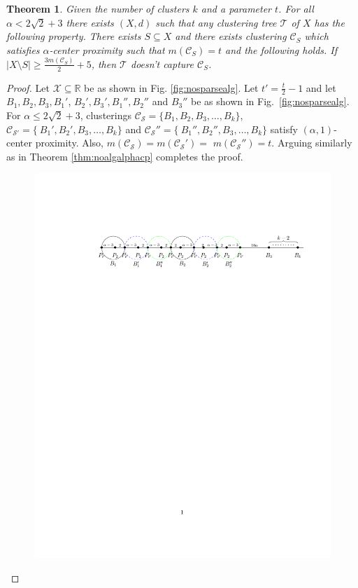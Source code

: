 \documentclass[12pt]{article}
\newtheorem{theorem}{Theorem}
\newcommand{\mc}{\mathcal}
\begin{document}
\begin{theorem}
\label{thm:nosparsealg}
Given the number of clusters $k$ and a parameter $t$. For all $\alpha < 2\sqrt 2 + 3$ there exists $(X, d)$ such that any clustering tree $\mc T$ of $X$ has the following property. There exists $S \subseteq X$ and there exists clustering $\mc C_{S}$ which satisfies $\alpha$-center proximity such that $m(\mc C_{S}) = t$ and the following holds. If $|X \setminus S| \ge \frac{3m(\mc C_{S})}{2}+5$, then $\mc T$ doesn't capture $\mc C_{S}$.
\end{theorem}
\begin{proof}
Let $\mc X \subseteq \mathbb{R}$ be as shown in Fig. \ref{fig:nosparsealg}. Let $t' = \frac{t}{2}-1$ and let $B_1, B_2, B_3, B_1'$, $B_2', B_3', B_1'', B_2''$ and $B_3''$ be as shown in Fig.~\ref{fig:nosparsealg}. For $\alpha \le 2\sqrt{2}+3$, clusterings $\mc C_{\mc S} = \{B_1, B_2, B_3, \ldots, B_k\}$, $\mc C_{\mc S'} = \{\ B_1', B_2', B_3, \ldots, B_k\}$ and $\mc C_{\mc S}'' = \{\ B_1'', B_2'', B_3, \ldots, B_k\}$ satisfy $(\alpha, 1)$-center proximity. Also, $m(\mc C_{\mc S}) = m(\mc C_{\mc S}') =$ $m(\mc C_{\mc S}'') = t$. Arguing similarly as in Theorem \ref{thm:noalgalphacp} completes the proof.
\begin{figure}[!t]
\vspace{-5mm}
\begin{center}
\includegraphics[trim={45mm 210mm 20mm 43mm},clip,width=\textwidth]{figures/clusteringNoise/lbdFig3.pdf}

\end{center}
\end{figure}
\end{proof}
\end{document}
